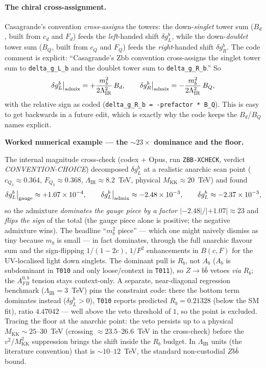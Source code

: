 \documentclass[11pt]{article}
\newenvironment{callout}[1]{%
  \par\medskip\begin{shaded}\noindent\textbf{#1}\par\smallskip}{\end{shaded}\medskip}
\newcommand{\MKK}{M_{\mathrm{KK}}}
\newcommand{\LIR}{\Lambda_{\mathrm{IR}}}
\newcommand{\vev}{v}
\newcommand{\code}[1]{\texttt{#1}}
\newcommand{\dgL}{\delta g_L^b}
\newcommand{\dgR}{\delta g_R^b}
\newcommand{\Afb}{A_{FB}^{0,b}}
\theoremstyle{definition}
\begin{document}
\paragraph{The chiral cross-assignment.} Casagrande's convention
\emph{cross-assigns} the towers: the down-\emph{singlet} tower sum
($B_d$, built from $c_d$ and $F_d$) feeds the \emph{left}-handed shift $\dgL$,
while the down-\emph{doublet} tower sum ($B_Q$, built from $c_Q$ and $F_Q$) feeds
the \emph{right}-handed shift $\dgR$. The code comment is explicit:
``Casagrande's Zbb convention cross-assigns the singlet tower sum to
\code{delta\_g\_L\_b} and the doublet tower sum to \code{delta\_g\_R\_b}.'' So
\begin{equation}
\dgL\big|_{\rm admix} = +\frac{m_b^2}{2\LIR^2}\,B_d,
\qquad
\dgR\big|_{\rm admix} = -\frac{m_b^2}{2\LIR^2}\,B_Q,
\end{equation}
with the relative sign as coded (\code{delta\_g\_R\_b = -prefactor * B\_Q}). This
is easy to get backwards in a future edit, which is exactly why the code keeps
the $B_d$/$B_Q$ names explicit.

\begin{callout}{Worked numerical example --- the $\sim 23\times$ dominance and the floor.}
The internal magnitude cross-check (codex + Opus, run \code{ZBB-XCHECK},
verdict \emph{CONVENTION-CHOICE}) decomposed $\dgL$ at a realistic anarchic scan
point ($c_{Q_3}\!\approx\!0.364$, $F_{Q_3}\!\approx\!0.368$, $\LIR\!\approx\!8.2$~TeV,
physical $\MKK\!\approx\!20$~TeV) and found
\[
\dgL\big|_{\rm gauge}\approx +1.07\times10^{-4},
\qquad
\dgL\big|_{\rm admix}\approx -2.48\times10^{-3},
\qquad
\dgL \approx -2.37\times 10^{-3},
\]
so the admixture \emph{dominates the gauge piece by a factor
$|{-2.48}|/|{+1.07}|\approx 23$} and \emph{flips the sign} of the total (the
gauge piece alone is positive; the negative admixture wins). The headline
``$m_b^2$ piece'' --- which one might naively dismiss as tiny because $m_b$ is
small --- in fact dominates, through the full anarchic flavour sum and the
sign-flipping $1/(1-2c)$, $1/F^2$ enhancements in $B(c,F)$ for the UV-localised
light down singlets. The dominant pull is $R_b$, not $A_b$ ($A_b$ is subdominant
in \code{T010} and only loose/context in \code{T011}), so $Z\to b\bar b$ vetoes
\emph{via} $R_b$; the $\Afb$ tension stays context-only. A separate,
near-diagonal regression benchmark ($\LIR=3$~TeV) pins the constraint code:
there the bottom term dominates instead ($\dgL>0$), \code{T010} reports predicted
$R_b=0.21328$ (below the SM fit), ratio $4.47042$ --- well above the veto
threshold of $1$, so the point is excluded. Tracing the floor at the anarchic
point: the veto persists up to a physical $\MKK\sim 25$--$30$~TeV (crossing
$\approx 23.5$--$26.6$~TeV in the cross-check) before the $\vev^2/\MKK^2$
suppression brings the shift inside the $R_b$ budget. In $\LIR$ units (the
literature convention) that is $\sim 10$--$12$~TeV, the standard non-custodial
$Zb\bar b$ bound.
\end{callout}
\end{document}

